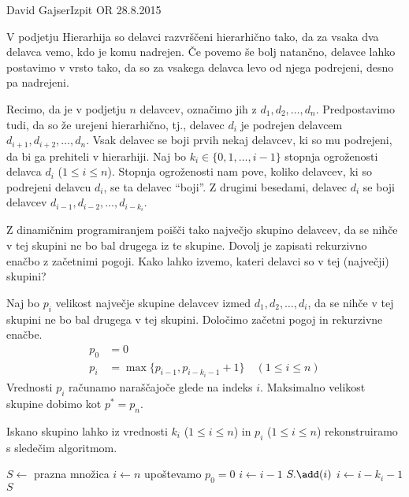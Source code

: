 \begin{naloga}{David Gajser}{Izpit OR 28.8.2015}
\begin{vprasanje}
V podjetju Hierarhija so delavci razvrščeni hierarhično tako,
da za vsaka dva delavca vemo, kdo je komu nadrejen.
Če povemo še bolj natančno, delavce lahko postavimo v vrsto tako,
da so za vsakega delavca levo od njega podrejeni, desno pa nadrejeni.

Recimo, da je v podjetju $n$ delavcev, označimo jih z $d_1, d_2, \dots, d_n$.
Predpostavimo tudi, da so že urejeni hierarhično,
tj., delavec $d_i$ je podrejen delavcem $d_{i+1}, d_{i+2}, \dots, d_n$.
Vsak delavec se boji prvih nekaj delavcev, ki so mu podrejeni,
da bi ga prehiteli v hierarhiji.
Naj bo $k_i \in \{0, 1, \dots, i-1\}$
stopnja ogroženosti delavca $d_i$ ($1 \le i \le n$).
Stopnja ogroženosti nam pove,
koliko delavcev, ki so podrejeni delavcu $d_i$, se ta delavec ``boji''.
Z drugimi besedami,
delavec $d_i$ se boji delavcev $d_{i-1}, d_{i-2}, \dots, d_{i-k_i}$.

Z dinamičnim programiranjem poišči tako največjo skupino delavcev,
da se nihče v tej skupini ne bo bal drugega iz te skupine.
Dovolj je zapisati rekurzivno enačbo z začetnimi pogoji.
Kako lahko izvemo, kateri delavci so v tej (največji) skupini?
\end{vprasanje}

\begin{odgovor}
Naj bo $p_i$ velikost največje skupine delavcev izmed $d_1, d_2, \dots, d_i$,
da se nihče v tej skupini ne bo bal drugega v tej skupini.
Določimo začetni pogoj in rekurzivne enačbe.
\begin{align*}
p_0 &= 0 \\
p_i &= \max\{p_{i-1}, p_{i-k_i-1} + 1\} \quad (1 \le i \le n)
\end{align*}
Vrednosti $p_i$ računamo naraščajoče glede na indeks $i$.
Maksimalno velikost skupine dobimo kot $p^* = p_n$.

Iskano skupino lahko iz vrednosti
$k_i$ ($1 \le i \le n$) in $p_i$ ($1 \le i \le n$)
rekonstruiramo s sledečim algoritmom.
\begin{small}
\begin{algorithmic}
	\State $S \gets$ prazna množica
	\State $i \gets n$
		 \hfill upoštevamo $p_0 = 0$
			\State $i \gets i-1$
		\Else
			\State $S.\add(i)$
			\State $i \gets i-k_i-1$
		\EndIf
	\EndWhile
	\State \Return $S$
\EndFunction
\end{algorithmic}
\end{small}
\end{odgovor}
\end{naloga}

